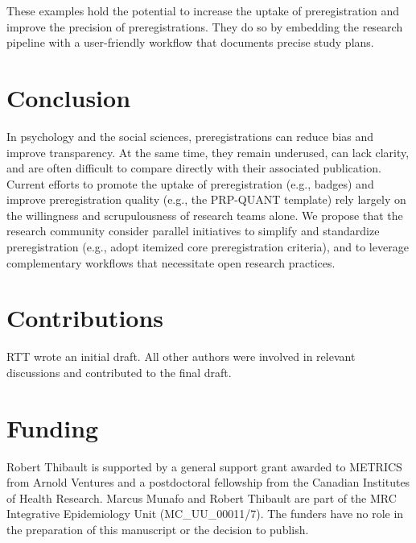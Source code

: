 \documentclass[authordate, meta]{jote-new-article}
\begin{document}
These examples hold the potential to increase the uptake of preregistration and improve the precision of preregistrations. They do so by embedding the research pipeline with a user-friendly workflow that documents precise study plans.








\section{Conclusion}



In psychology and the social sciences, preregistrations can reduce bias and improve transparency. At the same time, they remain underused, can lack clarity, and are often difficult to compare directly with their associated publication. Current efforts to promote the uptake of preregistration (e.g., badges) and improve preregistration quality (e.g., the PRP-QUANT template) rely largely on the willingness and scrupulousness of research teams alone. We propose that the research community consider parallel initiatives to simplify and standardize preregistration (e.g., adopt itemized core preregistration criteria), and to leverage complementary workflows that necessitate open research practices.







\section{Contributions}



RTT wrote an initial draft. All other authors were involved in relevant discussions and contributed to the final draft.







\section{Funding}



Robert Thibault is supported by a general support grant awarded to METRICS from Arnold Ventures and a postdoctoral fellowship from the Canadian Institutes of Health Research. Marcus Munafo and Robert Thibault are part of the MRC Integrative Epidemiology Unit (MC\_UU\_00011/7). The funders have no role in the preparation of this manuscript or the decision to publish.
\end{document}
